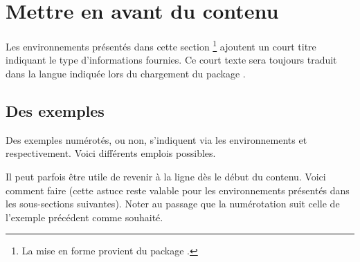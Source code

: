 

\usepackage[lang = french]{../main/main}
\usepackage{../macroenv/macroenv}
\usepackage{../showcase/showcase}
\usepackage{../listing/listing}
\usepackage{../inenglish/inenglish}


\usepackage{focus}




\section{Mettre en avant du contenu}

\begin{bdocnote}
	Les environnements présentés dans cette section
	\footnote{
		La mise en forme provient du package .
	}
	ajoutent un court titre indiquant le type d'informations fournies.
	Ce court texte sera toujours traduit dans la langue indiquée lors du chargement du package .
\end{bdocnote}	




\subsection{Des exemples}

Des exemples numérotés, ou non, s'indiquent via les environnements  et   respectivement. Voici différents emplois possibles.





Il peut parfois être utile de revenir à la ligne dès le début du contenu. Voici comment faire (cette astuce reste valable pour les environnements présentés dans les sous-sections suivantes). Noter au passage que la numérotation suit celle de l'exemple précédent comme souhaité.







